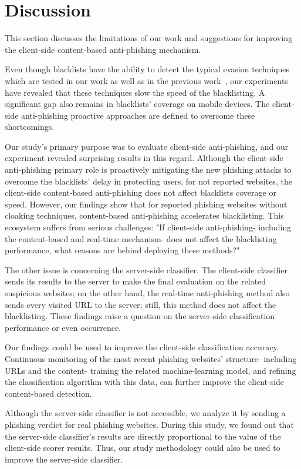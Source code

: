 \section{Discussion}
\label{s:discussion}

This section discusses the limitations of our work and suggestions for improving the client-side content-based anti-phishing mechanism.

Even though blacklists have the ability to detect the typical evasion techniques which are tested in our work as well as in the previous work~\cite{oest2020phishtime}, our experiments have revealed that these techniques slow the speed of the blacklisting. A significant gap also remains in blacklists' coverage on mobile devices. The client-side anti-phishing proactive approaches are defined to overcome these shortcomings.

Our study's primary purpose was to evaluate client-side anti-phishing, and our experiment revealed surprising results in this regard. Although the client-side anti-phishing primary role is proactively mitigating the new phishing attacks to overcome the blacklists' delay in protecting users, for not reported websites, the client-side content-based anti-phishing does not affect blacklists coverage or speed. However, our findings show that for reported phishing websites without cloaking techniques, content-based anti-phishing accelerates blacklisting. This ecosystem suffers from serious challenges: "If client-side anti-phishing- including the content-based and real-time mechanism- does not affect the blacklisting performance, what reasons are behind deploying these methods?"

The other issue is concerning the server-side classifier. The client-side classifier sends its results to the server to make the final evaluation on the related suspicious websites; on the other hand, the real-time anti-phishing method also sends every visited URL to the server; still, this method does not affect the blacklisting. These findings raise a question on the server-side classification performance or even occurrence.

Our findings could be used to improve the client-side classification accuracy. Continuous monitoring of the most recent phishing websites' structure- including URLs and the content- training the related machine-learning model, and refining the classification algorithm with this data, can further improve the client-side content-based detection.

Although the server-side classifier is not accessible, we analyze it by sending a phishing verdict for real phishing websites. During this study, we found out that the server-side classifier's results are directly proportional to the value of the client-side scorer results. Thus, our study methodology could also be used to improve the server-side classifier.

